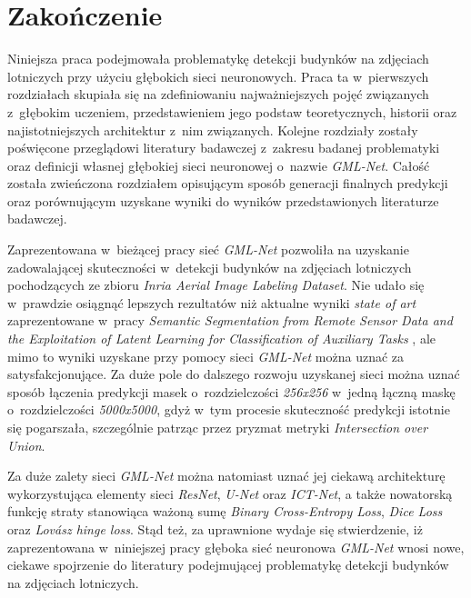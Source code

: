 \section{Zakończenie}

Niniejsza praca podejmowała problematykę detekcji budynków na zdjęciach lotniczych przy użyciu głębokich sieci neuronowych. Praca ta w~pierwszych rozdziałach skupiała się na zdefiniowaniu najważniejszych pojęć związanych z~głębokim uczeniem, przedstawieniem jego podstaw teoretycznych, historii oraz najistotniejszych architektur z~nim związanych. Kolejne rozdziały zostały poświęcone przeglądowi literatury badawczej z~zakresu badanej problematyki oraz definicji własnej głębokiej sieci neuronowej o~nazwie \textit{GML-Net}. Całość została zwieńczona rozdziałem opisującym sposób generacji finalnych predykcji oraz porównującym uzyskane wyniki do wyników przedstawionych literaturze badawczej.

Zaprezentowana w~bieżącej pracy sieć \textit{GML-Net} pozwoliła na uzyskanie zadowalającej skuteczności w~detekcji budynków na zdjęciach lotniczych pochodzących ze zbioru \textit{Inria Aerial Image Labeling Dataset}. Nie udało się w~prawdzie osiągnąć lepszych rezultatów niż aktualne wyniki \textit{state of art} zaprezentowane w~pracy \textit{Semantic Segmentation from Remote Sensor Data and the Exploitation of Latent Learning for Classification of Auxiliary Tasks} \cite{chatterjee}, ale mimo to wyniki uzyskane przy pomocy sieci \textit{GML-Net} można uznać za satysfakcjonujące. Za duże pole do dalszego rozwoju uzyskanej sieci można uznać sposób łączenia predykcji masek o~rozdzielczości \emph{256x256} w~jedną łączną maskę o~rozdzielczości \emph{5000x5000}, gdyż w~tym procesie skuteczność predykcji istotnie się pogarszała, szczególnie patrząc przez pryzmat metryki \textit{Intersection over Union}. 

Za duże zalety sieci \textit{GML-Net} można natomiast uznać jej ciekawą architekturę wykorzystująca elementy sieci \textit{ResNet}, \textit{U-Net} oraz \textit{ICT-Net}, a także nowatorską funkcję straty stanowiąca ważoną sumę \textit{Binary Cross-Entropy Loss}, \textit{Dice Loss} oraz \textit{Lovász hinge loss}. Stąd też, za uprawnione wydaje się stwierdzenie, iż zaprezentowana w~niniejszej pracy głęboka sieć neuronowa \textit{GML-Net} wnosi nowe, ciekawe spojrzenie do literatury podejmującej problematykę detekcji budynków na zdjęciach lotniczych.